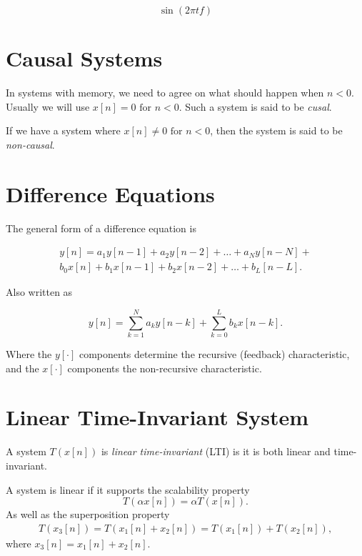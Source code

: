 \documentclass[openany]{book}
\def\lsqb{\left[}
\def\rsqb{\right]}
\def\sqb#1{\lsqb #1 \rsqb}
\def\xsig{x\sqb{n}}
\begin{document}
\begin{equation}
    \sin(2\pi tf)
\end{equation}

\section{Causal Systems}
In systems with memory, we need to agree on what should happen when $n < 0$. Usually we will use $x\left[n\right] = 0 \text{ for } n < 0$. Such a system is said to be \textit{cusal}.

If we have a system where $x\left[n\right] \neq 0 \text{ for } n < 0$, then the system is said to be \textit{non-causal}.

\section{Difference Equations}
The general form of a difference equation is

\begin{equation}
\begin{split}
    y\sqb{n} = a_1 y\sqb{n - 1} + a_2 y\sqb{n-2} + \dots + a_N y\sqb{n-N} + \\
        b_0 x\sqb{n} + b_1 x\sqb{n - 1} + b_2 x\sqb{n - 2} + \dots + b_L\sqb{n - L}.
\end{split}
\end{equation}

Also written as

\begin{equation}
    y\sqb{n} = \sum_{k=1}^N a_k y\sqb{n - k} + \sum_{k=0}^L b_k x\sqb{n - k}.
\end{equation}

Where the $y\sqb{\cdot}$ components determine the recursive (feedback) characteristic, and the $x\sqb{\cdot}$ components the non-recursive characteristic.

\section{Linear Time-Invariant System}

A system $T(x\sqb{n})$ is \textit{linear time-invariant} (LTI) is it is both linear and time-invariant.

A system is linear if it supports the scalability property 
\begin{equation}
    T(\alpha \xsig) = \alpha T(\xsig).
\end{equation}
As well as the superposition property 
\begin{gather}
    T(x_3\sqb{n}) = T(x_1\sqb{n} + x_2\sqb{n}) =  T(x_1\sqb{n}) + T(x_2\sqb{n}), 
\end{gather}
where $x_3\sqb{n} = x_1\sqb{n} + x_2\sqb{n}$.
\end{document}
